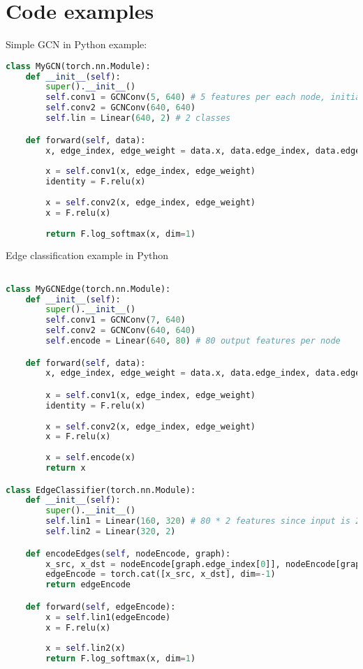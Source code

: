 \chapter{Code examples}

Simple GCN in Python example:
\begin{lstlisting}[language=Python]
class MyGCN(torch.nn.Module):
    def __init__(self):
        super().__init__()
        self.conv1 = GCNConv(5, 640) # 5 features per each node, initialy 1
        self.conv2 = GCNConv(640, 640)
        self.lin = Linear(640, 2) # 2 classes 

    def forward(self, data):        
        x, edge_index, edge_weight = data.x, data.edge_index, data.edge_weight
        
        x = self.conv1(x, edge_index, edge_weight)
        identity = F.relu(x)
        
        x = self.conv2(x, edge_index, edge_weight)
        x = F.relu(x)
        
        return F.log_softmax(x, dim=1)    
\end{lstlisting}

Edge classification example in Python
\begin{lstlisting}[language=Python]

class MyGCNEdge(torch.nn.Module):
    def __init__(self):
        super().__init__()
        self.conv1 = GCNConv(7, 640)
        self.conv2 = GCNConv(640, 640)
        self.encode = Linear(640, 80) # 80 output features per node

    def forward(self, data):        
        x, edge_index, edge_weight = data.x, data.edge_index, data.edge_weight

        x = self.conv1(x, edge_index, edge_weight)
        identity = F.relu(x)
        
        x = self.conv2(x, edge_index, edge_weight)
        x = F.relu(x)
        
        x = self.encode(x)
        return x

class EdgeClassifier(torch.nn.Module):
    def __init__(self):
        super().__init__()
        self.lin1 = Linear(160, 320) # 80 * 2 features since input is 2 nodes.
        self.lin2 = Linear(320, 2)

    def encodeEdges(self, nodeEncode, graph):
        x_src, x_dst = nodeEncode[graph.edge_index[0]], nodeEncode[graph.edge_index[1]]
        edgeEncode = torch.cat([x_src, x_dst], dim=-1)        
        return edgeEncode

    def forward(self, edgeEncode):        
        x = self.lin1(edgeEncode)
        x = F.relu(x)
        
        x = self.lin2(x)
        return F.log_softmax(x, dim=1)

\end{lstlisting}